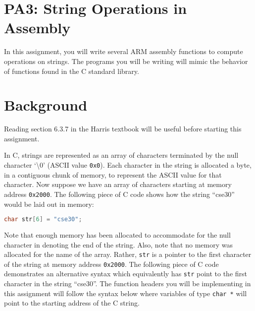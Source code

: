 \documentclass{article}
\begin{document}
\section{PA3: String Operations in Assembly}

In this assignment, you will write several ARM assembly functions to compute operations on strings. The programs you will be writing will mimic the behavior of functions found in the C standard library.

\section{Background}

Reading section 6.3.7 in the Harris textbook will be useful before starting this assignment. \newline

In C, strings are represented as an array of characters terminated by the null character `\textbackslash 0' (ASCII value {\tt 0x0}). Each character in the string is allocated a byte, in a contiguous chunk of memory, to represent the ASCII value for that character. Now suppose we have an array of characters starting at memory address {\tt0x2000}. The following piece of C code shows how the string ``cse30'' would be laid out in memory: \newline

\begin{lstlisting}[language = C]
char str[6] = "cse30";
\end{lstlisting}

\renewcommand{\arraystretch}{2}
\begin{table}[h]
\centering
{}
\end{table}


\newline Note that enough memory has been allocated to accommodate for the null character in denoting the end of the string. 
Also, note that no memory was allocated for the name of the array. Rather, {\tt str} is a pointer to the first character of the string at memory address {\tt0x2000}. The following piece of C code demonstrates an alternative syntax which  equivalently has {\tt str} point to the first character in the string ``cse30''. The function headers you will be implementing in this assignment will follow the syntax below where variables of type {\tt char *} will point to the starting address of the C string. \newline
\end{document}
